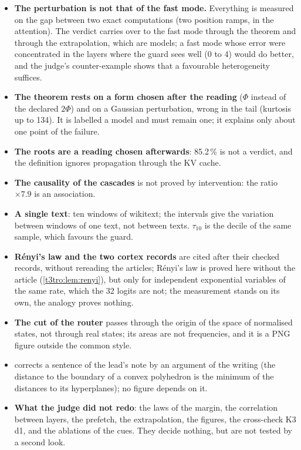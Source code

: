\begin{faux}
\begin{itemize}
\item \textbf{The perturbation is not that of the fast mode.} Everything is measured on the gap between two exact computations (two position ramps, in the attention). The verdict carries over to the fast mode through the theorem and through the extrapolation, which are models; a fast mode whose error were concentrated in the layers where the guard sees well (0 to 4) would do better, and the judge's counter-example shows that a favourable heterogeneity suffices.
\item \textbf{The theorem rests on a form chosen after the reading} ($\Phi$ instead of the declared $2\Phi$) and on a Gaussian perturbation, wrong in the tail (kurtosis up to 134). It is labelled a model and must remain one; it explains only about one point of the failure.
\item \textbf{The roots are a reading chosen afterwards}: 85.2\,\% is not a verdict, and the definition ignores propagation through the KV cache.
\item \textbf{The causality of the cascades} is not proved by intervention: the ratio $\times 7.9$ is an association.
\item \textbf{A single text}: ten windows of wikitext; the intervals give the variation between windows of one text, not between texts. $\tau_{10}$ is the decile of the same sample, which favours the guard.
\item \textbf{Rényi's law and the two cortex records} are cited after their checked records, without rereading the articles; Rényi's law is proved here without the article (\cref{t3tro:lem:renyi}), but only for independent exponential variables of the same rate, which the 32 logits are not; the measurement stands on its own, the analogy proves nothing.
\item \textbf{The cut of the router} passes through the origin of the space of normalised states, not through real states; its areas are not frequencies, and it is a PNG figure outside the common style.
\item \textbf{} corrects a sentence of the lead's note by an argument of the writing (the distance to the boundary of a convex polyhedron is the minimum of the distances to its hyperplanes); no figure depends on it.
\item \textbf{What the judge did not redo}: the laws of the margin, the correlation between layers, the prefetch, the extrapolation, the figures, the cross-check K3 d1, and the ablations of the cues. They decide nothing, but are not tested by a second look.
\end{itemize}
\end{faux}
